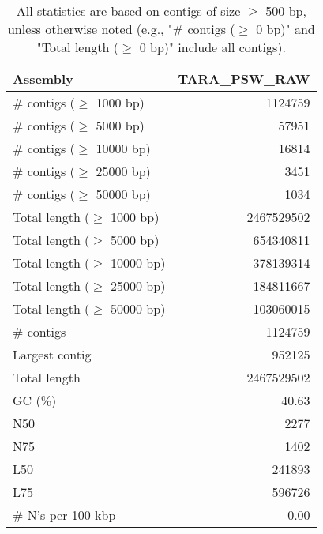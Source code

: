 \documentclass[12pt,a4paper]{article}
\begin{document}
\begin{table}[ht]
\begin{center}
\caption{All statistics are based on contigs of size $\geq$ 500 bp, unless otherwise noted (e.g., "\# contigs ($\geq$ 0 bp)" and "Total length ($\geq$ 0 bp)" include all contigs).}
\begin{tabular}{|l*{1}{|r}|}
\hline
Assembly & TARA\_PSW\_RAW \\ \hline
\# contigs ($\geq$ 1000 bp) & 1124759 \\ \hline
\# contigs ($\geq$ 5000 bp) & 57951 \\ \hline
\# contigs ($\geq$ 10000 bp) & 16814 \\ \hline
\# contigs ($\geq$ 25000 bp) & 3451 \\ \hline
\# contigs ($\geq$ 50000 bp) & 1034 \\ \hline
Total length ($\geq$ 1000 bp) & 2467529502 \\ \hline
Total length ($\geq$ 5000 bp) & 654340811 \\ \hline
Total length ($\geq$ 10000 bp) & 378139314 \\ \hline
Total length ($\geq$ 25000 bp) & 184811667 \\ \hline
Total length ($\geq$ 50000 bp) & 103060015 \\ \hline
\# contigs & 1124759 \\ \hline
Largest contig & 952125 \\ \hline
Total length & 2467529502 \\ \hline
GC (\%) & 40.63 \\ \hline
N50 & 2277 \\ \hline
N75 & 1402 \\ \hline
L50 & 241893 \\ \hline
L75 & 596726 \\ \hline
\# N's per 100 kbp & 0.00 \\ \hline
\end{tabular}
\end{center}
\end{table}
\end{document}
